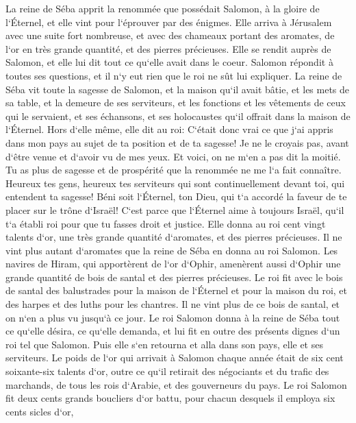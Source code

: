 \verse La reine de Séba apprit la renommée que possédait Salomon, à la gloire de l`Éternel, et elle vint pour l`éprouver par des énigmes. 
\verse Elle arriva à Jérusalem avec une suite fort nombreuse, et avec des chameaux portant des aromates, de l`or en très grande quantité, et des pierres précieuses. Elle se rendit auprès de Salomon, et elle lui dit tout ce qu`elle avait dans le coeur. 
\verse Salomon répondit à toutes ses questions, et il n`y eut rien que le roi ne sût lui expliquer. 
\verse La reine de Séba vit toute la sagesse de Salomon, et la maison qu`il avait bâtie, 
\verse et les mets de sa table, et la demeure de ses serviteurs, et les fonctions et les vêtements de ceux qui le servaient, et ses échansons, et ses holocaustes qu`il offrait dans la maison de l`Éternel. 
\verse Hors d`elle même, elle dit au roi: C`était donc vrai ce que j`ai appris dans mon pays au sujet de ta position et de ta sagesse! 
\verse Je ne le croyais pas, avant d`être venue et d`avoir vu de mes yeux. Et voici, on ne m`en a pas dit la moitié. Tu as plus de sagesse et de prospérité que la renommée ne me l`a fait connaître. 
\verse Heureux tes gens, heureux tes serviteurs qui sont continuellement devant toi, qui entendent ta sagesse! 
\verse Béni soit l`Éternel, ton Dieu, qui t`a accordé la faveur de te placer sur le trône d`Israël! C`est parce que l`Éternel aime à toujours Israël, qu`il t`a établi roi pour que tu fasses droit et justice. 
\verse Elle donna au roi cent vingt talents d`or, une très grande quantité d`aromates, et des pierres précieuses. Il ne vint plus autant d`aromates que la reine de Séba en donna au roi Salomon. 
\verse Les navires de Hiram, qui apportèrent de l`or d`Ophir, amenèrent aussi d`Ophir une grande quantité de bois de santal et des pierres précieuses. 
\verse Le roi fit avec le bois de santal des balustrades pour la maison de l`Éternel et pour la maison du roi, et des harpes et des luths pour les chantres. Il ne vint plus de ce bois de santal, et on n`en a plus vu jusqu`à ce jour. 
\verse Le roi Salomon donna à la reine de Séba tout ce qu`elle désira, ce qu`elle demanda, et lui fit en outre des présents dignes d`un roi tel que Salomon. Puis elle s`en retourna et alla dans son pays, elle et ses serviteurs. 
\verse Le poids de l`or qui arrivait à Salomon chaque année était de six cent soixante-six talents d`or, 
\verse outre ce qu`il retirait des négociants et du trafic des marchands, de tous les rois d`Arabie, et des gouverneurs du pays. 
\verse Le roi Salomon fit deux cents grands boucliers d`or battu, pour chacun desquels il employa six cents sicles d`or, 

